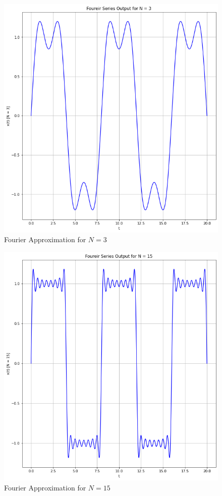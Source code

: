 \documentclass[12pt]{report}
\begin{document}
\begin{figure}[h!]
  \centering
  \includegraphics[scale=.5]{p1t2-1.png}
  \caption{Fourier Approximation for $N = 3$}
  \label{fig: p1t2-1}
\end{figure}
\begin{figure}[h!]
  \centering
  \includegraphics[scale=.5]{p1t2-2.png}
  \caption{Fourier Approximation for $N = 15$}
  \label{fig: p1t2-2}
\end{figure}
\end{document}

